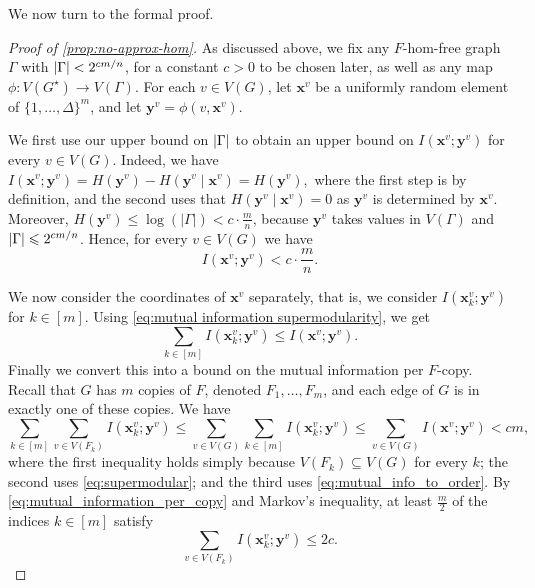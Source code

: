 \documentclass[reqno, english, 12pt]{amsart}
\theoremstyle{plain}
\theoremstyle{remark}
\newcommand{\bx}{\mathbf{x}}
\newcommand{\by}{\mathbf{y}}
\DeclarePairedDelimiter{\abs}{\lvert}{\rvert}
\renewcommand{\leq}{\leqslant}
\begin{document}
We now turn to the formal proof.

\begin{proof}[Proof of \cref{prop:no-approx-hom}]
	As discussed above, we fix any $F$-hom-free graph $\Gamma$ with $\abs{\Gamma} < 2^{c m/n}$, for a constant $c>0$ to be chosen later, as well as any map $\phi:V(G^{\star})\rightarrow V(\Gamma)$. For each $v \in V(G)$, let $\bx^v$ be a uniformly random element of $\{1,\dots,\Delta\}^m$, and let $\by^v = \phi(v,\bx^v)$.
	 


	We first use our upper bound on $\abs{\Gamma}$ to obtain an upper bound on $I(\bx^v;\by^v)$ for every $v \in V(G)$. Indeed, we have $I(\bx^v;\by^v) = H(\by^v)- H(\by^v\mid\bx^v) = H(\by^v),$ where the first step is by definition, and the second uses that $H(\by^v\mid\bx^v) = 0$ as $\by^v$ is determined by $\bx^v$.
	   Moreover, $H(\by^v) \leq \log(|\Gamma|) < c \cdot \frac{m}{n}$, because $\by^v$ takes values in $V(\Gamma)$ and $\abs \Gamma \leq 2^{cm/n}$. Hence, for every $v \in V(G)$ we have
		\begin{equation}\label{eq:mutual_info_to_order}
		I(\bx^v;\by^v) < c \cdot \frac{m}{n}.
		\end{equation}

	   

	We now consider the coordinates of $\bx^v$ separately, that is, we consider $I(\bx^v_k;\by^v)$ for $k \in [m]$.
	Using \eqref{eq:mutual information supermodularity}, we get
	\begin{equation}\label{eq:supermodular}
		\sum_{k\in[m]}I(\bx^v_k;\by^v) \leq I(\bx^v;\by^v).
	\end{equation}
	Finally we convert this into a bound on the mutual information {per $F$-copy}. Recall that $G$ has $m$ copies of $F$, denoted $F_1,\dots,F_m$, and each edge of $G$ is in exactly one of these copies.  
	\nolinebreak We \nolinebreak have
	\begin{equation}\label{eq:mutual_information_per_copy}
		\sum_{k\in[m]}\sum_{v\in V(F_k)}I(\bx^v_k;\by^v) \leq 
		\sum_{v\in V(G)}\sum_{k \in [m]}I(\bx^v_k;\by^v) \leq 
		\sum_{v\in V(G)}I(\bx^v;\by^v) < cm,
	\end{equation}
	where the first inequality holds simply because $V(F_k) \subseteq V(G)$ for every $k$; the second uses \eqref{eq:supermodular}; and the third uses \eqref{eq:mutual_info_to_order}. 
	By \eqref{eq:mutual_information_per_copy} and Markov's inequality, at least $\frac{m}{2}$ of the indices $k \in [m]$ satisfy
   \begin{equation}\label{eq:many_F-copies}
		\sum_{v\in V(F_k)}I(\bx^v_k;\by^v) \leq 2c.
	\end{equation}
    

\end{proof}
\end{document}
